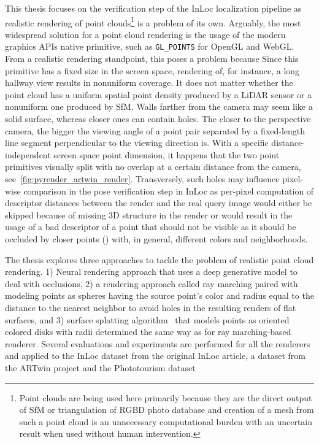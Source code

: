 This thesis focuses on the verification step of the InLoc localization pipeline
as realistic rendering of point clouds\footnote{Point clouds are being used here
primarily because they are the direct output of SfM or triangulation of RGBD photo database and creation of
a mesh from such a point cloud is an unnecessary computational burden with an uncertain result when used
without human intervention.}
is a problem of its own. Arguably, the most widespread solution
for a point cloud rendering is the usage of the modern graphics APIs native primitive, such as \verb|GL_POINTS|
for OpenGL and WebGL. From a realistic rendering standpoint, this poses a problem because  Since this primitive has a fixed
size in the screen space, rendering of, for instance, a long hallway view results in nonuniform
 coverage. It does not matter whether the point cloud has a uniform spatial point
density produced by a LiDAR sensor or a nonuniform one produced by SfM. Walls farther from the camera may seem
like a solid surface, whereas closer ones can contain holes. The closer to the perspective camera, the bigger the
viewing angle of a point pair separated by a fixed-length line segment perpendicular to the viewing direction
is. With a specific distance-independent
screen space point dimension, it happens that the two point primitives visually split with no overlap
at a certain distance from the camera, see~\cref{fig:pyrender_artwin_render}. Transversely, such holes
may influence pixel-wise comparison in the pose verification step in InLoc as per-pixel computation of
descriptor distances between the render and the real query image would either be skipped because of missing
3D structure in the render or would result in the usage of a bad descriptor of a point that should not be visible
as it should be occluded by closer points () with, in general, different colors and neighborhoods.

The thesis explores three approaches to tackle the problem of realistic point cloud rendering. 1) Neural rendering
approach that uses a deep generative model to deal with occlusions, 2) a rendering approach
called ray marching paired with modeling points as spheres having the source point's color and radius equal
to the distance to the nearest neighbor to avoid holes in the resulting renders of flat surfaces, and 3)
surface splatting algorithm~\citep{SurfaceSplatting} that models points as oriented colored disks with radii determined the same
way as for ray marching-based renderer. Several evaluations and experiments are performed for all the
renderers and applied to the InLoc dataset from the original InLoc article, a dataset from the ARTwin
project and the Phototourism
dataset

